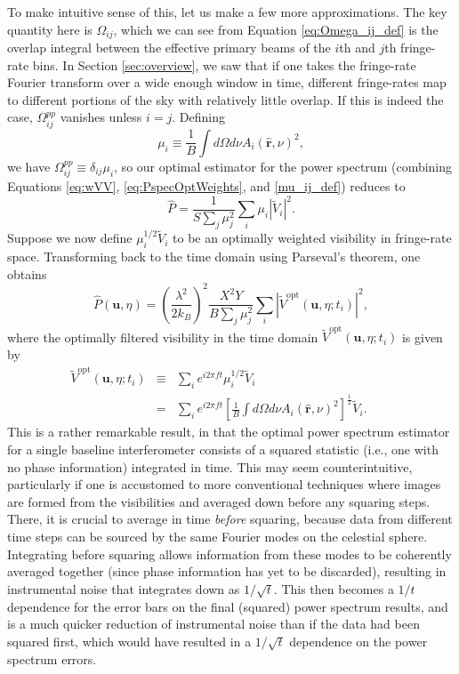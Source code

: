 \documentclass[twocolumn,apj,numberedappendix]{emulateapj}
\newcommand{\rhat}{\hat{\mathbf{r}}}
\begin{document}
To make intuitive sense of this, let us make a few more approximations. The key quantity here is $\Omega_{ij}$, which we can see from Equation \eqref{eq:Omega_ij_def} is the overlap integral between the effective primary beams of the $i$th and $j$th fringe-rate bins. In Section \ref{sec:overview}, we saw that if one takes the fringe-rate Fourier transform over a wide enough window in time, different fringe-rates map to different portions of the sky with relatively little overlap. If this is indeed the case, $\Omega_{ij}^{pp}$ vanishes unless $i=j$. Defining
\begin{equation}
\label{mu_ij_def}
\mu_i  \equiv \frac{1}{B} \int d\Omega d\nu A_i(\rhat,\nu)^2,
\end{equation}
we have $\Omega_{ij}^{pp} \equiv \delta_{ij} \mu_i$, so our optimal estimator for the power spectrum (combining Equations \ref{eq:wVV}, \ref{eq:PspecOptWeights}, and \ref{mu_ij_def}) reduces to
\begin{equation}
\widehat{P} = \frac{1}{S \sum_j \mu_j^2}\sum_i \mu_i | \widetilde{V}_i |^2 .
\end{equation}
Suppose we now define $\mu_i^{1/2} \widetilde{V}_i$ to be an optimally weighted visibility in fringe-rate space. Transforming back to the time domain using Parseval's theorem, one obtains
\begin{equation}
\label{eq:finalEst}
\widehat{P}(\mathbf{u}, \eta) = \left( \frac{\lambda^2}{2 k_B} \right)^2 \frac{X^2 Y}{B\sum_j \mu_j^2} \sum_i |\widetilde{V}^\textrm{opt} (\mathbf{u}, \eta; t_i)|^2,
\end{equation}
where the optimally filtered visibility in the time domain $\widetilde{V}^\textrm{opt} (\mathbf{u}, \eta; t_i)$ is given by
\begin{eqnarray}
\widetilde{V}^\textrm{opt} (\mathbf{u}, \eta; t_i) &\equiv& \sum_i e^{i 2 \pi f t} \mu_i^{1/2} \widetilde{V}_i \nonumber \\
&=&  \sum_i e^{i 2 \pi f t} \left[\frac{1}{B} \int d\Omega d\nu A_i(\rhat,\nu)^2\right]^\frac{1}{2} \widetilde{V}_i. \qquad
\end{eqnarray}
This is a rather remarkable result, in that the optimal power spectrum estimator for a single baseline interferometer consists of a squared statistic (i.e., one with no phase information) integrated in time. This may seem counterintuitive, particularly if one is accustomed to more conventional techniques where images are formed from the visibilities and averaged down before any squaring steps. There, it is crucial to average in time \emph{before} squaring, because data from different time steps can be sourced by the same Fourier modes on the celestial sphere. Integrating before squaring allows information from these modes to be coherently averaged together (since phase information has yet to be discarded), resulting in instrumental noise that integrates down as $1/\sqrt{t}$. This then becomes a $1/t$ dependence for the error bars on the final (squared) power spectrum results, and is a much quicker reduction of instrumental noise than if the data had been squared first, which would have resulted in a $1/\sqrt{t}$ dependence on the power spectrum errors.
\end{document}
